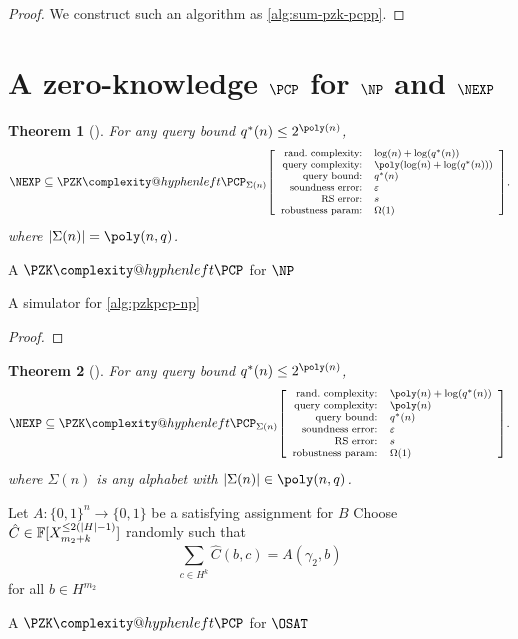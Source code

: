 \documentclass[english,12pt]{reedthesis}
\makeatletter
\theoremstyle{plain}
\newtheorem{thm}{Theorem}[section]
\theoremstyle{definition}
\theoremstyle{remark}
\DeclarePairedDelimiter{\abs}{\lvert}{\rvert}
\newcommand{\pzkpcpr}[6]{%
  \ensuremath%
  \mleft[{\footnotesize\begin{array}{r l}
    \text{rand.\ complexity:} & #1 \\
    \text{query complexity:} & #2 \\
    \text{query bound:} & #3 \\
    \text{soundness error:} & #4 \\
    \text{RS error:} & #5 \\
    \text{robustness param:} & #6
  \end{array}}\mright]%
}
\newcommand{\PZKPCP}{%
  \PZK\complexity@hyphenleft\PCP
}
\makeatother
\begin{document}
\begin{proof}
  We construct such an algorithm as \cref{alg:sum-pzk-pcpp}. %
\end{proof}

\section{A zero-knowledge $\PCP$ for $\NP$ and $\NEXP$}\label{sec:pzkpcp-np-nexp}

\begin{thm}[{\cite[Theorem 6.3]{GOS25}}]\label{thm:np-zk-pcp}
  For any query bound $q^{*}(n) \le 2^{\poly(n)}$,
  \[
    \NEXP \subseteq
    \PZKPCP_{\Sigma(n)}\pzkpcpr{\log(n)+\log(q^{*}(n))}{\poly(\log(n) + \log(q^{*}(n)))}{q^{*}(n)}{\varepsilon}{s}{\Omega(1)}.
  \]
  where $\abs{\Sigma(n)} = \poly(n, q)$.
\end{thm}

\begin{algorithm}[htbp]
  \caption{A $\PZKPCP$ for $\NP$~\cite[Theorem 6.3]{GOS25}}\label{alg:pzkpcp-np}
\end{algorithm}

\begin{algorithm}[htbp]
  \caption{A simulator for \cref{alg:pzkpcp-np}}\label{alg:pzkpcp-np-sim}
\end{algorithm}

\begin{proof}
\end{proof}

\begin{thm}[{\cite[Theorem 6.3]{GOS25}}]\label{thm:nexp-zk-pcp}
  For any query bound $q^{*}(n) \le 2^{\poly(n)}$,
  \[
    \NEXP \subseteq
    \PZKPCP_{\Sigma(n)}\pzkpcpr{\poly(n)+\log(q^{*}(n))}{\poly(n)}{q^{*}(n)}{\varepsilon}{s}{\Omega(1)}.
  \]
  where $\Sigma(n)$ is any alphabet with $\abs{\Sigma(n)} \in \poly(n, q)$.
\end{thm}

\begin{algorithm}[htbp]
  Let $A\colon \{0, 1\}^{n} \rightarrow \{0, 1\}$ be a satisfying assignment for $B$\;
  Choose $\hat{C} \in \mathbb{F}[X_{m_{2} + k}^{\le 2(\abs{H} - 1)}]$ randomly such
  that
  \[
    \sum_{c \in H^{k}}\hat{C}(b, c) = A(\gamma_{2}, b)
  \]
  for all $b \in H^{m_{2}}$\;
  \;
  \caption{A $\PZKPCP$ for $\OSAT$~\cite[Construction 6.4]{GOS25}}\label{alg:pcp-osat}
\end{algorithm}
\end{document}

